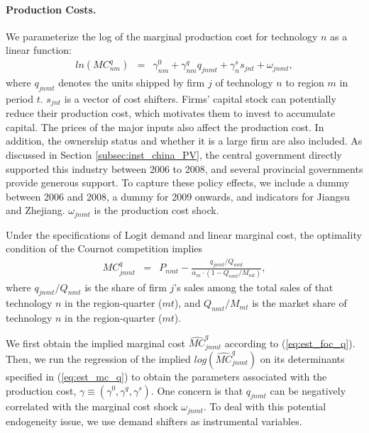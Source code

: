\documentclass[12pt]{article}
\begin{document}
\paragraph{Production Costs.} We parameterize the log of the marginal production cost for technology $n$ as a linear function:
    \begin{eqnarray}
       ln( MC^q_{nm} )&=&\gamma_{nm}^0+\gamma_{nm}^q q_{jnmt}+\gamma_n^s s_{jnt}+\omega_{jnmt} \label{eq:est_mc_q},
    \end{eqnarray}
where $q_{jnmt}$ denotes the units shipped by firm $j$ of technology $n$ to region $m$ in period $t$. $s_{jnt}$ is a vector of cost shifters. Firms' capital stock can potentially reduce their production cost, which motivates them to invest to accumulate capital. The prices of the major inputs also affect the production cost. In addition, the ownership status and whether it is a large firm are also included. As discussed in Section \ref{subsec:inst_china_PV}, the central government directly supported this industry between 2006 to 2008, and several provincial governments provide generous support. To capture these policy effects, we include a dummy between 2006 and 2008, a dummy for 2009 onwards, and indicators for Jiangsu and Zhejiang. $\omega_{jnmt}$ is the production cost shock.  %

Under the specifications of Logit demand and linear marginal cost, the optimality condition of the Cournot competition implies
\begin{eqnarray}
  MC^q_{jnmt} &=&P_{nmt} - \frac{q_{jnmt}/Q_{nmt}}{\alpha_{m} \cdot (1-Q_{nmt}/M_{mt})}, \label{eq:est_foc_q}
\end{eqnarray}
where $q_{jnmt}/Q_{nmt}$ is the share of firm $j$'s sales among the total sales of that technology $n$ in the region-quarter ($mt$), and $Q_{nmt}/M_{mt}$ is the market share of technology $n$ in the region-quarter ($mt$).

We first obtain the implied marginal cost $\widehat{MC}^q_{jnmt}$ according to (\ref{eq:est_foc_q}). Then, we run the regression of the implied $log(\widehat{MC}^q_{jnmt})$ on its determinants specified in (\ref{eq:est_mc_q}) to obtain the parameters associated with the production cost, $\gamma \equiv (\gamma^0,\gamma^q,\gamma^s)$. One concern is that $q_{jnmt}$ can be negatively correlated with the marginal cost shock $\omega_{jnmt}$. To deal with this potential endogeneity issue, we use demand shifters as instrumental variables.
\end{document}
